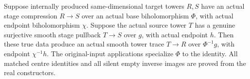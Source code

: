 \begin{theorem}
\label{hir:submersion-compressed-image-trace-geometric-composition}
\leanok
{}

Suppose internally produced same-dimensional target towers $R,S$ have an actual stage compression $R\to S$ over an actual base biholomorphism $\Phi$, with actual endpoint biholomorphism $\chi$. Suppose the actual source tower $T$ has a genuine surjective smooth stage pullback $T\to S$ over $g$, with actual endpoint $h$. Then these true data produce an actual smooth tower trace $T\to R$ over $\Phi^{-1}g$, with endpoint $\chi^{-1}h$. The original-input applications specialize $\Phi$ to the identity. All matched centre identities and all silent empty inverse images are proved from the real constructors.
\end{theorem}
